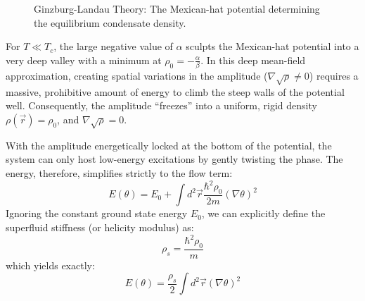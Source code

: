 \documentclass[english,binding=0.6cm,noexaminfo]{sapthesis}
\newcommand{\rhos}{\rho_s}
\begin{document}
\begin{figure}[H]
    \centering 
    \caption{Ginzburg-Landau Theory: The Mexican-hat potential determining the equilibrium condensate density.}
    \label{fig:mexican_hat}
\end{figure}

For $T \ll T_c$, the large negative value of $\alpha$ sculpts the Mexican-hat potential into a very deep valley with a minimum at $\rho_0 = -\frac{\alpha}{\beta}$. In this deep mean-field approximation, creating spatial variations in the amplitude ($\nabla\sqrt{\rho} \neq 0$) requires a massive, prohibitive amount of energy to climb the steep walls of the potential well. Consequently, the amplitude ``freezes'' into a uniform, rigid density $\rho(\vec{r}) = \rho_0$, and $\nabla\sqrt{\rho} = 0$.

With the amplitude energetically locked at the bottom of the potential, the system can only host low-energy excitations by gently twisting the phase. The energy, therefore, simplifies strictly to the flow term:
\begin{equation}
    E(\theta) = E_0 + \int d^2\vec{r} \frac{\hbar^2\rho_0}{2m}(\nabla\theta)^2
\end{equation}
Ignoring the constant ground state energy $E_0$, we can explicitly define the superfluid stiffness (or helicity modulus) as:
\begin{equation}
    \rhos = \frac{\hbar^2\rho_0}{m}
\end{equation}
which yields exactly:
\begin{equation}
    E(\theta) = \frac{\rhos}{2} \int d^2\vec{r} (\nabla\theta)^2
\label{superconducting_energy}
\end{equation}
\end{document}
